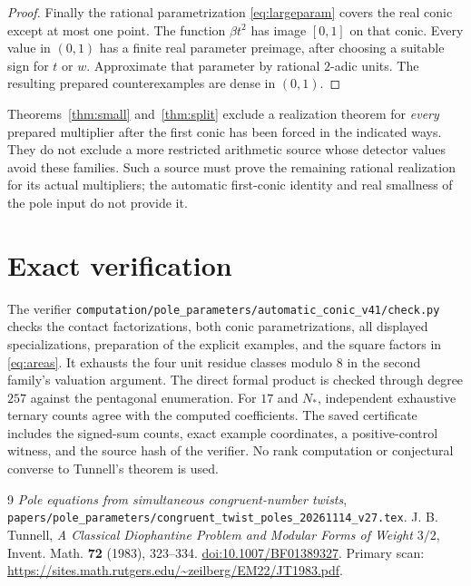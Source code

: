 \documentclass[11pt,a4paper]{article}
\theoremstyle{definition}\newtheorem{definition}[theorem]{Definition}
\begin{document}
\begin{proof}
Finally the rational parametrization \eqref{eq:largeparam} covers the
real conic except at most one point. The function $\beta t^2$ has
image $[0,1]$ on that conic. Every value in $(0,1)$ has a finite real
parameter preimage, after choosing a suitable sign for $t$ or $w$.
Approximate that parameter by rational $2$-adic units. The resulting
prepared counterexamples are dense in $(0,1)$.
\end{proof}

Theorems~\ref{thm:small} and~\ref{thm:split} exclude a realization
theorem for \emph{every} prepared multiplier after the first conic has
been forced in the indicated ways. They do not exclude a more restricted
arithmetic source whose detector values avoid these families. Such a source
must prove the remaining rational realization for its actual multipliers;
the automatic first-conic identity and real smallness of the pole input
do not provide it.

\section{Exact verification}

The verifier
\nolinkurl{computation/pole_parameters/automatic_conic_v41/check.py}
checks the contact factorizations, both conic parametrizations, all displayed
specializations, preparation of the explicit examples, and the square
factors in \eqref{eq:areas}. It exhausts the four unit residue classes
modulo $8$ in the second family's valuation argument. The direct formal
product is checked through degree $257$ against the pentagonal enumeration.
For $17$ and $N_*$, independent exhaustive ternary counts agree with the
computed coefficients. The saved certificate includes the signed-sum
counts, exact example coordinates, a positive-control witness, and the
source hash of the verifier. No rank computation or conjectural converse
to Tunnell's theorem is used.

\begin{thebibliography}{9}
\emph{Pole equations from simultaneous congruent-number twists},
\nolinkurl{papers/pole_parameters/congruent_twist_poles_20261114_v27.tex}.
J. B. Tunnell, \emph{A Classical Diophantine Problem and Modular Forms
of Weight $3/2$}, Invent. Math. \textbf{72} (1983), 323--334.
\href{https://doi.org/10.1007/BF01389327}{doi:10.1007/BF01389327}.
Primary scan:
\url{https://sites.math.rutgers.edu/~zeilberg/EM22/JT1983.pdf}.
\end{thebibliography}
\end{document}
